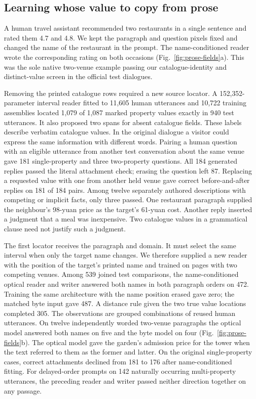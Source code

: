 \subsection*{Learning whose value to copy from prose}
A human travel assistant recommended two restaurants in a single sentence and rated them 4.7 and 4.8. We kept the paragraph and question pixels fixed and changed the name of the restaurant in the prompt. The name-conditioned reader wrote the corresponding rating on both occasions (Fig.~\ref{fig:prose-fields}a). This was the sole native two-venue example passing our catalogue-identity and distinct-value screen in the official test dialogues.

Removing the printed catalogue rows required a new source locator. A 152,352-parameter interval reader fitted to 11,605 human utterances and 10,722 training assemblies located 1,079 of 1,087 marked property values exactly in 940 test utterances. It also proposed two spans for absent catalogue fields. These labels describe verbatim catalogue values. In the original dialogue a visitor could express the same information with different words. Pairing a human question with an eligible utterance from another test conversation about the same venue gave 181 single-property and three two-property questions. All 184 generated replies passed the literal attachment check; erasing the question left 87. Replacing a requested value with one from another held venue gave correct before-and-after replies on 181 of 184 pairs. Among twelve separately authored descriptions with competing or implicit facts, only three passed. One restaurant paragraph supplied the neighbour's 98-yuan price as the target's 61-yuan cost. Another reply inserted a judgment that a meal was inexpensive. Two catalogue values in a grammatical clause need not justify such a judgment.

The first locator receives the paragraph and domain. It must select the same interval when only the target name changes. We therefore supplied a new reader with the position of the target's printed name and trained on pages with two competing venues. Among 539 joined test comparisons, the name-conditioned optical reader and writer answered both names in both paragraph orders on 472. Training the same architecture with the name position erased gave zero; the matched byte input gave 487. A distance rule given the two true value locations completed 305. The observations are grouped combinations of reused human utterances. On twelve independently worded two-venue paragraphs the optical model answered both names on five and the byte model on four (Fig.~\ref{fig:prose-fields}b). The optical model gave the garden's admission price for the tower when the text referred to them as the former and latter. On the original single-property cases, correct attachments declined from 181 to 176 after name-conditioned fitting. For delayed-order prompts on 142 naturally occurring multi-property utterances, the preceding reader and writer passed neither direction together on any passage.

